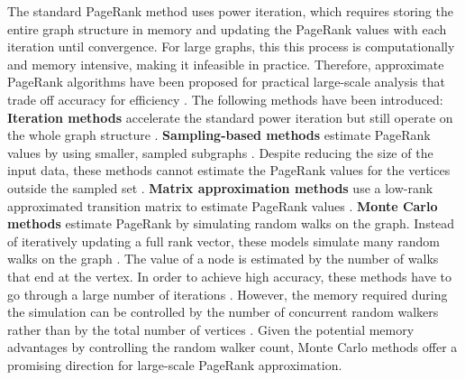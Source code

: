 The standard PageRank method uses power iteration, which requires storing the entire graph structure in memory and updating the PageRank values with each iteration until convergence. For large graphs, this this process is computationally and memory intensive, making it infeasible in practice. Therefore, approximate PageRank algorithms have been proposed for practical large-scale analysis that trade off accuracy for efficiency \cite{wu_efficient_2024}. The following methods have been introduced:
\textbf{Iteration methods} \cite{xie_parameterized_2023-1}\cite{anikin_efficient_2022} accelerate the standard power iteration but still operate on the whole graph structure \cite{wu_efficient_2024}. 
\textbf{Sampling-based methods} estimate PageRank values by using smaller, sampled subgraphs \cite{bar-yossef_local_2008}\cite{chen_local_2004}. Despite reducing the size of the input data, these methods cannot estimate the PageRank values for the vertices outside the sampled set \cite{wu_efficient_2024}.
\textbf{Matrix approximation methods} use a low-rank approximated transition matrix to estimate PageRank values \cite{liu_fast_2015}\cite{benczur_feasibility_2005}. 
\textbf{Monte Carlo methods} estimate PageRank by simulating random walks on the graph. Instead of iteratively updating a full rank vector, these models simulate many random walks on the graph \cite{avrachenkov_monte_2007}. The value of a node is estimated by the number of walks that end at the vertex. In order to achieve high accuracy, these methods have to go through a large number of iterations \cite{wu_efficient_2024}. However, the memory required during the simulation can be controlled by the number of concurrent random walkers rather than by the total number of vertices \cite{avrachenkov_monte_2007}. Given the potential memory advantages by controlling the random walker count, Monte Carlo methods offer a promising direction for large-scale PageRank approximation.